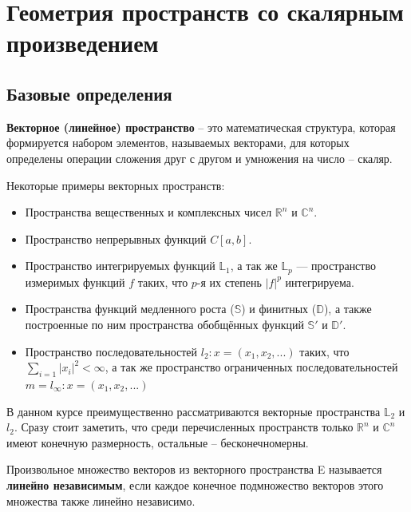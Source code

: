 \documentclass[12pt]{article}
\begin{document}
\section{Геометрия пространств со скалярным произведением}


	\subsection{Базовые определения}

		\begin{defi} 
			\textbf{Векторное (линейное) пространство} -- это математическая структура, которая формируется набором
			элементов, называемых векторами, для которых определены операции сложения друг с другом и
			умножения на число -- скаляр.
		\end{defi}

		Некоторые примеры векторных пространств:
			\begin{itemize}
				\item Пространства вещественных и комплексных чисел $\mathbb{R}^n$ и $\mathbb{C}^n$.
				\item Пространство непрерывных функций $C[a,b]$.
				\item Пространство интегрируемых функций $\mathbb{L}_1$, а так же $\mathbb{L}_p$ ---
				пространство измеримых функций $f$ таких, что $p$-я их степень $|f|^p$ интегрируема.
				\item Пространства функций медленного роста ($\mathbb{S}$) и финитных ($\mathbb{D}$), а также
				построенные по ним пространства обобщённых функций $\mathbb{S}'$ и $\mathbb{D}'$.
				\item Пространство последовательностей $l_2 : x = (x_1, x_2, ...)$ таких, что
				$\sum_{i=1} |x_i|^2 < \infty$, а так же пространство ограниченных последовательностей
				$m = l_\infty : x = (x_1, x_2, ...)$
			\end{itemize}

		В данном курсе преимущественно рассматриваются векторные пространства $\mathbb{L}_2$ и $l_2$. Сразу
		стоит заметить, что среди перечисленных пространств только $\mathbb{R}^n$ и $\mathbb{C}^n$ имеют
		конечную размерность, остальные -- бесконечномерны.
	
		\begin{defi}
			Произвольное множество векторов из векторного пространства E называется \textbf{линейно
			независимым}, если каждое конечное подмножество векторов этого множества также линейно
			независимо.
		\end{defi}
\end{document}
